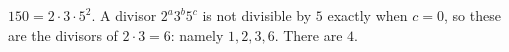 $150=2\cdot3\cdot5^2$. A divisor $2^a3^b5^c$ is not divisible by $5$ exactly when $c=0$, so these are the divisors of $2\cdot3=6$: namely $1,2,3,6$. There are $\boxed{4}$.
